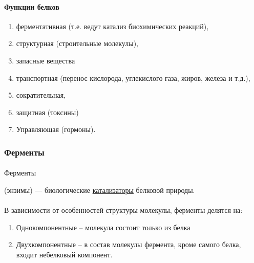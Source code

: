 \paragraph{Функции белков}

\begin{enumerate}

	\item ферментативная (т.е. ведут катализ биохимических реакций),
	\item структурная (строительные молекулы),
	\item запасные вещества
	\item транспортная (перенос кислорода, углекислого газа, жиров, железа и т.д.),
	\item сократительная,
	\item защитная (токсины)
	\item Управляющая (гормоны).

\end{enumerate}

\subsubsection*{Ферменты}


\paragraph*{}\hypertarget{enzimes}{Ферменты} (энзимы) — биологические \hyperlink{catalith}{катализаторы} белковой природы.
\paragraph*{}В зависимости от особенностей структуры молекулы, ферменты делятся на:

\begin{enumerate}
\item Однокомпонентные -- молекула состоит только из белка
\item Двухкомпонентные -- в состав молекулы фермента, кроме самого белка, входит небелковый компонент. 

\end{enumerate}


